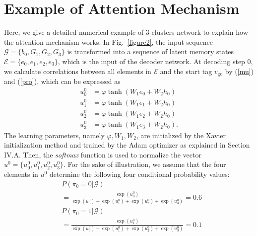 \documentclass[journal]{IEEEtran}
\begin{document}
\appendices
      {\section{Example of Attention Mechanism \vspace{1.3\baselineskip}}\label{app:t1}
        Here, we give a detailed numerical example of 3-clusters network to explain how the attention mechanism works. In Fig.~\ref{figure2}, the input sequence $\bm{\mathcal{G}} = \{b_0, G_1, G_2, G_3\}$ is transformed into a sequence of latent memory states $\bm{\mathcal{E}} = \{e_0, e_1, e_2, e_3\}$, which is the input of the decoder network. At decoding step 0, we calculate correlations between all elements in $\bm{\mathcal{E}}$ and the start tag $v_{\text{go}}$ by (\ref{mu}) and (\ref{pro}), which can be expressed as
        \begin{align}
            \tag{A.1}
            u^0_0 &=
	        \varphi \tanh{\left(W_{1}e_0 + W_2h_0\right)} \\\tag{A.2}
	        u^0_1 &=
	        \varphi \tanh{\left(W_{1}e_1 + W_2h_0\right)} \\\tag{A.3}
	         u^0_2 &=
	        \varphi \tanh{\left(W_{1}e_2 + W_2h_0\right)} \\\tag{A.4}
	        u^0_3 &=
	        \varphi \tanh{\left(W_{1}e_3 + W_2h_0\right)}.
       \end{align}
      The learning parameters, namely $\varphi, W_{1}, W_{2}$, are initialized by the Xavier initialization method and trained by the Adam optimizer as explained in Section IV.A. Then, the \emph{softmax} function is used to normalize the vector $u^0=\{u^0_0, u^0_1, u^0_2, u^0_3\}$. For the sake of illustration, we assume that the four elements in $u^0$ determine the following four conditional probability values:
      \begin{align}
        &P(\pi_{0}=0|\bm{\mathcal{G}})\nonumber \\  \tag{A.5} &= \frac{\exp{\left(u^0_0\right)}}{\exp{\left(u^0_0\right)} + \exp{\left(u^0_1\right)} + \exp{\left(u^0_2\right)} + \exp{\left(u^0_3\right)}} = 0.6
      \end{align}
      \begin{align}
        &P(\pi_{0}=1|\bm{\mathcal{G}})\nonumber \\  \tag{A.6} &= \frac{\exp{\left(u^0_1\right)}}{\exp{\left(u^0_0\right)} + \exp{\left(u^0_1\right)} + \exp{\left(u^0_2\right)} + \exp{\left(u^0_3\right)}} = 0.1
      \end{align}
     \begin{align}

\end{align}}
\end{document}
